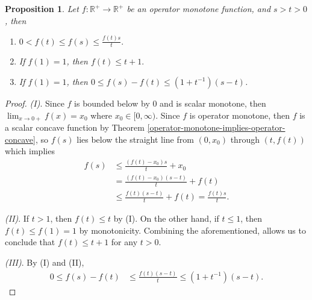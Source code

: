 \documentclass[12pt,a4paper]{amsart}
\newtheorem{proposition}[theorem]{Proposition}
\theoremstyle{definition}
\begin{document}
	\begin{proposition}\label{barry-simon-operator-monotone-function-properties}
		Let $f: \mathbb{R}^{+} \rightarrow \mathbb{R}^{+}$ be an operator monotone function, and $s > t > 0$, then
		\begin{enumerate}[label=\textnormal{(\Roman*)}]
			\item $0 < f(t) \leq f(s)\leq  \frac{f(t)s}{t}.$
			\item If $f(1)=1$, then $f(t) \leq t + 1.$
			\item If $f(1)=1$, then $0 \leq f(s) - f(t) \leq (1+t^{-1})( s-t) $.
		\end{enumerate}
	\end{proposition}
	\begin{proof}
		\emph{\textnormal{(I)}}.  Since $f$ is bounded below by $0$ and is scalar monotone, then $\displaystyle \lim_{x \rightarrow 0+}f(x)=x_0$ where $x_0 \in [0, \infty)$. Since $f$ is operator monotone, then $f$ is  a scalar concave function by Theorem \ref{operator-monotone-implies-operator-concave}, so $f(s)$ lies below the straight line from $(0, x_0)$ through $(t, f(t))$ which implies
		\begin{equation*}
			\begin{split}
				f(s) &\leq \frac{(f(t)- x_0)s}{t} + x_0 \\
				&= \frac{(f(t) - x_0)(s-t)}{t} + f(t) \\
				&\leq \frac{f(t)(s-t)}{t} + f(t) = \frac{f(t)s}{t}.
			\end{split}
		\end{equation*}
		\par 
		\emph{\textnormal{(II)}}. If $t > 1$, then $f(t) \leq t$ by (I). On the other hand, if $t \leq 1$, then $f(t) \leq f(1) = 1$ by monotonicity. Combining the aforementioned, allows us to conclude that $f(t) \leq t +1$ for any $t > 0$.
		\par 
		\emph{\textnormal{(III)}}. By (I) and (II), 
		\begin{equation*}
			\begin{split}
				0 \leq f(s) - f(t) &\leq \frac{f(t)(s-t)}{t} \leq (1 + t^{-1})(s-t).
			\end{split}
		\end{equation*}
	\end{proof}
	
\end{document}
